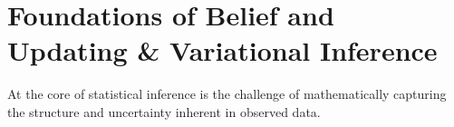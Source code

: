 \documentclass[mstat,12pt]{unswthesis}
\begin{document}



\section{Foundations of Belief and Updating \& Variational Inference}

At the core of statistical inference is the challenge of mathematically capturing the structure and uncertainty inherent in observed data.
\end{document}
